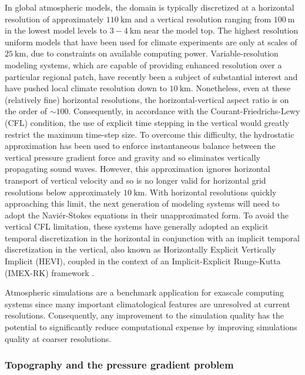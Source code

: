 \documentclass[11pt]{article}
\begin{document}
In global atmospheric models, the domain is typically discretized at a horizontal resolution of approximately $110\ \mbox{km}$ and a vertical resolution ranging from $100\ \mbox{m}$ in the lowest model levels to $3-4\ \mbox{km}$ near the model top.  The highest resolution uniform models that have been used for climate experiments are only at scales of $25\ \mbox{km}$, due to constraints on available computing power.  Variable-resolution modeling systems, which are capable of providing enhanced resolution over a particular regional patch, have recently been a subject of substantial interest and have pushed local climate resolution down to $10\ \mbox{km}$.  Nonetheless, even at these (relatively fine) horizontal resolutions, the horizontal-vertical aspect ratio is on the order of $\sim 100$.  Consequently, in accordance with the Courant-Friedrichs-Lewy (CFL) condition, the use of explicit time stepping in the vertical would greatly restrict the maximum time-step size.  To overcome this difficulty, the hydrostatic approximation has been used to enforce instantaneous balance between the vertical pressure gradient force and gravity and so eliminates vertically propagating sound waves.  However, this approximation ignores horizontal transport of vertical velocity and so is no longer valid for horizontal grid resolutions below approximately $10\ \mbox{km}$.  With horizontal resolutions quickly approaching this limit, the next generation of modeling systems will need to adopt the Navi\'er-Stokes equations in their unapproximated form.  To avoid the vertical CFL limitation, these systems have generally adopted an explicit temporal discretization in the horizontal in conjunction with an implicit temporal discretization in the vertical, also known as Horizontally Explicit Vertically Implicit (HEVI), coupled in the context of an Implicit-Explicit Runge-Kutta (IMEX-RK) framework \cite{UASJRRJS1997AMM, PAUCJ2012MWR, HWSJLNW2013JCP}.

Atmospheric simulations are a benchmark application for exascale computing systems since many important climatological features are unresolved at current resolutions.  Consequently, any improvement to the simulation quality has the potential to significantly reduce computational expense by improving simulations quality at coarser resolutions.

\subsubsection{Topography and the pressure gradient problem} \label{sec:TopographyPGF}
\end{document}
